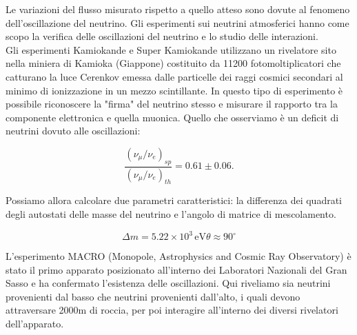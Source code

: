 \documentclass[11pt, oneside]{article}   	%
\begin{document}
Le variazioni del flusso misurato rispetto a quello atteso sono dovute al fenomeno dell'oscillazione del neutrino. Gli esperimenti sui neutrini atmosferici hanno come scopo la verifica delle oscillazioni del neutrino e lo studio delle interazioni. \\

Gli esperimenti Kamiokande e Super Kamiokande utilizzano un rivelatore sito nella miniera di Kamioka (Giappone) costituito da 11200 fotomoltiplicatori che catturano la luce Cerenkov emessa dalle particelle dei raggi cosmici secondari al minimo di ionizzazione in un mezzo scintillante. In questo tipo di esperimento è possibile riconoscere la "firma" del neutrino stesso e misurare il rapporto tra la componente elettronica e quella muonica. Quello che osserviamo è un deficit di neutrini dovuto alle oscillazioni: 

\begin{equation} 
   \frac{(\nu_\mu / \nu_e)_{sp}}{(\nu_\mu / \nu_e)_{th}} = 0.61\pm 0.06.
\end{equation}

Possiamo allora calcolare due parametri caratteristici: la differenza dei quadrati degli autostati delle masse del neutrino e l'angolo di matrice di mescolamento.

\begin{equation} 
	 \Delta m = 5.22 \times 10^3 \,\text{eV}
         \theta \approx 90^\circ
\end{equation}

L'esperimento MACRO (Monopole, Astrophysics and Cosmic Ray Observatory) è stato il primo apparato posizionato all'interno dei Laboratori Nazionali del Gran Sasso e ha confermato l'esistenza delle oscillazioni. Qui riveliamo sia neutrini provenienti dal basso che  neutrini provenienti dall'alto, i quali  devono attraversare 2000m di roccia, per poi interagire all'interno dei diversi rivelatori dell'apparato.\\
\end{document}
